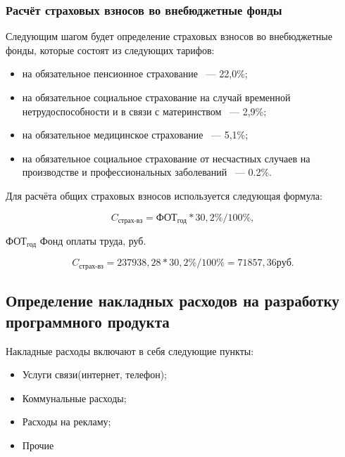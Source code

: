 \subsubsection{Расчёт страховых взносов во внебюджетные фонды}

Следующим шагом будет определение страховых взносов во внебюджетные фонды, которые состоят
из следующих тарифов:

\begin{itemize}
    \item на обязательное пенсионное страхование ~--- 22,0\%;
    \item на обязательное социальное страхование на случай временной нетрудоспособности и в связи с материнством ~--- 2,9\%;
    \item на обязательное медицинское страхование ~--- 5,1\%;
    \item на обязательное социальное страхование от несчастных случаев на производстве и профессиональных заболеваний ~--- 0.2\%.
\end{itemize}

Для расчёта общих страховых взносов используется следующая формула:

\begin{equation}
    C_\text{страх-вз} = \text{ФОТ}_\text{год} * 30,2\% / 100\%,
\end{equation}

\begin{eqexpl}[25mm]
    \item{$\text{ФОТ}_\text{год}$} Фонд оплаты труда, руб.
\end{eqexpl}

\begin{equation*}
    C_\text{страх-вз} = 237938,28 * 30,2\% / 100\% = 71857,36 руб.
\end{equation*}

\tocless\subsection{Определение накладных расходов на разработку программного продукта}

Накладные расходы включают в себя следующие пункты:

\begin{itemize}
    \item Услуги связи(интернет, телефон);
    \item Коммунальные расходы;
    \item Расходы на рекламу;
    \item Прочие
\end{itemize}

